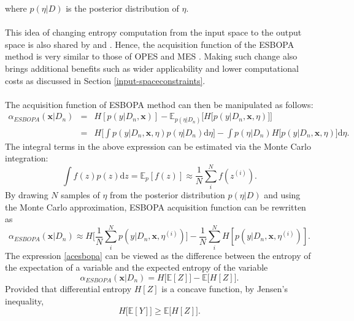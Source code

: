 \documentclass[a4paper,11pt]{report}
\begin{document}
where $ p(\eta \vert D) $ is the posterior distribution of $\eta $.
\\\\ 
This idea of changing entropy computation from the input space to the output space is also shared by \cite{hoffman2015} and \cite{wang2017max}. Hence, the acquisition function of the ESBOPA method is very similar to those of OPES\cite{hoffman2015}  and MES \cite{wang2017max}. Making such change also brings additional benefits such as wider applicability and lower computational costs as discussed in Section \ref{input-spaceconstraints}. 
\\\\ \noindent
The acquisition function of ESBOPA method can then be manipulated as follows:
 	\begin{eqnarray*}
	\alpha_{ESBOPA}(\mathbf{x} \vert D_n ) &=& H[p(y \vert D_n,\mathbf{x})]- \mathbb{E} _{p(\eta \vert D_n)}\Big[H \big[p(y \vert D_n,\mathbf{x},\eta) \big] \Big] 
	\\ &=& H \Big[ \int p(y \vert D_n,\mathbf{x},\eta) p(\eta \vert D_n) \mathrm{d}\eta \Big]- \int p(\eta \vert D_n) H \big[p(y \vert D_n,\mathbf{x},\eta) \big] \mathrm{d}\eta.
	\end{eqnarray*}
The integral terms in the above expression can be estimated via the Monte Carlo integration\cite{bishop2006pattern}:
        \begin{equation}
        \int f(z) p(z) \mathrm{d} z = \mathbb{E}_p [f(z)] \approx \frac{1}{N} \sum_i^{N} f(z^{(i)}).
        \end{equation}
\noindent        
By drawing $N$ samples of $\eta$ from the posterior distribution $p(\eta \vert D)$ and using the Monte Carlo approximation, ESBOPA acquisition function can be rewritten as
	\begin{equation} \label{acesbopa}
	\alpha_{ESBOPA}(\mathbf{x} \vert D_n ) \approx H \Big[  \frac{1}{N} \sum_i^{N} p(y \vert D_n,\mathbf{x},\eta^{(i)}) \Big]-  \frac{1}{N} \sum_i^{N} H [p(y \vert D_n,\mathbf{x},\eta^{(i)})]. 
	\end{equation} 
The expression \ref{acesbopa} can be viewed as the difference between the entropy of the expectation of a variable and the expected entropy of the variable 
	\begin{equation} 
	\alpha_{ESBOPA}(\mathbf{x} \vert D_n ) = H\big[ \mathbb{E} [Z]  \big] - \mathbb{E} \big[H [Z] \big] .
	\end{equation}  
Provided that differential entropy $H [Z]$ is a concave function, by Jensen's inequality, 
 	\begin{equation}
	H\big[ \mathbb{E} [Y]  \big]  \geq \mathbb{E} \big[H [Z] \big].
     	\end{equation}
\end{document}
